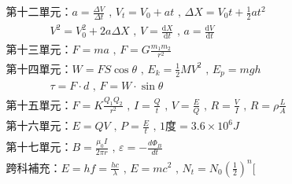 \documentclass{article}
\begin{document}
\[\begin{aligned}
&\text{第十二單元：} a=\frac{\Delta V}{\Delta t} \text{ , } V_t=V_0+at \text{ , } \Delta X=V_0t+\frac{1}{2}at^2 \\
&\qquad\qquad V^2=V_0^2+2a\Delta X \text{ , } V=\frac{\mathrm{d}X}{\mathrm{d}t} \text{ , } a=\frac{\mathrm{d}V}{\mathrm{d}t} \\

&\text{第十三單元：} F=ma \text{ , } F=G \frac{m_1 m_2}{r^2} \\

&\text{第十四單元：} W=FS\cos\theta \text{ , } E_k=\frac{1}{2}MV^2 \text{ , } E_p=mgh \\
&\qquad\qquad \tau=F \cdot d \text{ , } F=W \cdot \sin\theta \\

&\text{第十五單元：} F=K \frac{Q_1 Q_2}{r^2} \text{ , } I=\frac{Q}{t} \text{ , } V=\frac{E}{Q} \text{ , } R=\frac{V}{I} \text{ , } R=\rho \frac{L}{A} \\

&\text{第十六單元：} E=QV \text{ , } P=\frac{E}{t} \text{ , } 1\text{度}=3.6 \times 10^6 J \\

&\text{第十七單元：} B=\frac{\mu_0 I}{2\pi r} \text{ , } \varepsilon = -\frac{d\Phi_B}{dt} \\
&\text{跨科補充：} E=hf=\frac{hc}{\lambda} \text{ , } E=mc^2 \text{ , } N_t=N_0 (\frac{1}{2})^n
[\end{aligned}\]
\end{document}
